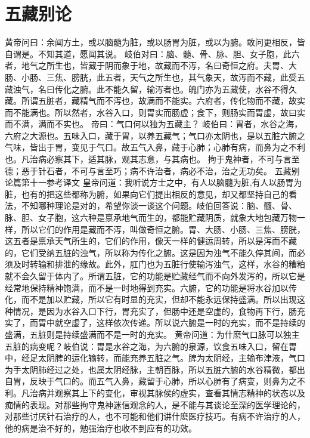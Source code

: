 \documentclass[a4paper,12pt,UTF8,twoside]{ctexbook}
\begin{document}
\chapter{五藏别论}
黄帝问曰：余闻方土，或以脑髓为脏，或以肠胃为脏，或以为腑。敢问更相反，皆自谓是。不知其道，愿闻其说。
岐伯对曰：脑、髓、骨、脉、胆、女子胞，此六者，地气之所生也，皆藏于阴而象于地，故藏而不泻，名曰奇恒之府。夫胃、大肠、小肠、三焦、膀胱，此五者，天气之所生也，其气象天，故泻而不藏，此受五藏浊气，名曰传化之腑。此不能久留，输泻者也。魄门亦为五藏使，水谷不得久藏。所谓五脏者，藏精气而不泻也，故满而不能实。六府者，传化物而不藏，故实而不能满也。所以然者，水谷入口，则胃实而肠虚；食下，则肠实而胃虚，故曰实而不满，满而不实也。
帝曰：气口何以独为五藏主？
岐伯曰：胃者，水谷之海，六府之大源也。五味入口，藏于胃，以养五藏气；气口亦太阴也，是以五脏六腑之气味，皆出于胃，变见于气口。故五气入鼻，藏于心肺；心肺有病，而鼻为之不利也。凡治病必察其下，适其脉，观其志意，与其病也。
拘于鬼神者，不可与言至德；恶于针石者，不可与言至巧；病不许治者，病必不治，治之无功矣。
五藏别论篇第十一参考译文
皇帝问道：我听说方士之中，有人以脑髓为脏,有人以肠胃为脏，也有的把这些都称为腑，如果向它们提出相反的意见，却又都坚持自己的看法，不知哪种理论是对的，希望你谈一谈这个问题。岐伯回答说：脑、髓、骨、脉、胆、女子胞，这六种是禀承地气而生的，都能贮藏阴质，就象大地包藏万物一样，所以它们的作用是藏而不泻，叫做奇恒之腑。胃、大肠、小肠、三焦、膀胱，这五者是禀承天气所生的，它们的作用，像天一样的健运周转，所以是泻而不藏的，它们受纳五脏的浊气，所以称为传化之腑。这是因为浊气不能久停其间，而必须及时转输和排泄的缘故。此外，肛门也为五脏行使输泻浊气，这样，水谷的糟粕就不会久留于体内了。所谓五脏，它的功能是贮藏经气而不向外发泻的，所以它是经常地保持精神饱满，而不是一时地得到充实。六腑，它的功能是将水谷加以传化，而不是加以贮藏，所以它有时显的充实，但却不能永远保持盛满。所以出现这种情况，是因为水谷入口下行，胃充实了，但肠中还是空虚的，食物再下行，肠充实了，而胃中就空虚了，这样依次传递。所以说六腑是一时的充实，而不是持续的盛满，五脏则是持续盛满而不是一时的充实。
黄帝问道：为什麽气口脉可以独主五脏的病变呢？岐伯说：胃是水谷之海，为六腑的泉源，饮食五味入口，留在胃中，经足太阴脾的运化输转，而能充养五脏之气。脾为太阴经，主输布津液，气口为手太阴肺经过之处，也属太阴经脉，主朝百脉，所以五脏六腑的水谷精微，都出自胃，反映于气口的。而五气入鼻，藏留于心肺，所以心肺有了病变，则鼻为之不利。凡治病并观察其上下的变化，审视其脉侯的虚实，查看其情志精神的状态以及痴情的表现。对那些拘守鬼神迷信观念的人，是不能与其谈论至深的医学理论的，对那些讨厌针石治疗的人，也不可能和他们讲什麽医疗技巧。有病不许治疗的人，他的病是治不好的，勉强治疗也收不到应有的功效。
\end{document}
